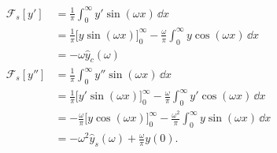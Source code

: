{%
\begin{Solution}
  \label{solution ode ft fst y' y''}
  \begin{align*}
    \mathcal{F}_s[y']
    &= \frac{1}{\pi} \int_0^\infty y' \sin(\omega x)\,\dd x \\
    &= \frac{1}{\pi}\Big[y \sin(\omega x)\Big]_0^\infty 
    - \frac{\omega}{\pi} \int_0^\infty y \cos(\omega x)\,\dd x \\
    &= - \omega \hat{y}_c(\omega) \\
    \mathcal{F}_s[y'']
    &= \frac{1}{\pi} \int_0^\infty y'' \sin(\omega x)\,\dd x \\
    &= \frac{1}{\pi} \Big[y' \sin(\omega x)\Big]_0^\infty 
    - \frac{\omega}{\pi} \int_0^\infty y' \cos(\omega x)\,\dd x \\
    &= - \frac{\omega}{\pi}\Big[y \cos(\omega x)\Big]_0^\infty 
    - \frac{\omega^2} {\pi} \int_0^\infty y \sin(\omega x)\,\dd x \\
    &= -\omega^2 \hat{y}_s(\omega) + \frac{\omega}{\pi} y(0).
  \end{align*}
\end{Solution}





}
